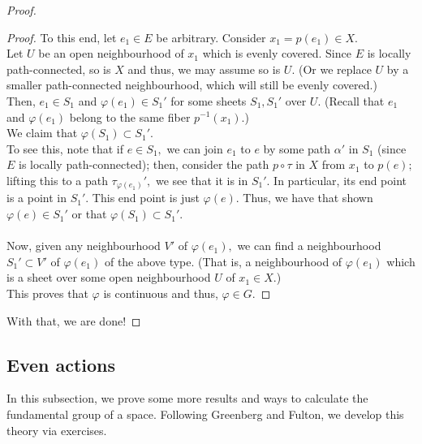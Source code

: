 \documentclass[12pt]{article}
\theoremstyle{definition}
\numberwithin{thm}{section}
\newenvironment{blockquote}
{\begin{mdframed}[skipabove=0pt, skipbelow=0pt, innertopmargin=4pt, innerbottommargin=4pt, bottomline=false,topline=false,rightline=false, linewidth=2pt]}
{\end{mdframed}}
\begin{document}
\begin{proof}
\begin{blockquote}
\begin{proof}
			To this end, let $e_1 \in E$ be arbitrary. Consider $x_1 = p(e_1) \in X.$\\
			Let $U$ be an open neighbourhood of $x_1$ which is evenly covered. Since $E$ is locally path-connected, so is $X$ and thus, we may assume so is $U.$ (Or we replace $U$ by a smaller path-connected neighbourhood, which will still be evenly covered.)\\
			Then, $e_1 \in S_1$ and $\varphi(e_1) \in S_1'$ for some sheets $S_1, S_1'$ over $U.$ (Recall that $e_1$ and $\varphi(e_1)$ belong to the same fiber $p^{-1}(x_1).$) \\
			We claim that $\varphi(S_1) \subset S_1'.$ \\
			To see this, note that if $e \in S_1,$ we can join $e_1$ to $e$ by some path $\alpha'$ in $S_1$ (since $E$ is locally path-connected); then, consider the path $p\circ \tau$ in $X$ from $x_1$ to $p(e);$ lifting this to a path $\tau_{\varphi(e_1)}',$ we see that it is in $S_1'.$ In particular, its end point is a point in $S_1'.$ This end point is just $\varphi(e).$ Thus, we have that shown $\varphi(e) \in S_1'$ or that $\varphi(S_1) \subset S_1'.$\\~\\
			Now, given any neighbourhood $V'$ of $\varphi(e_1),$ we can find a neighbourhood $S_1' \subset V'$ of $\varphi(e_1)$ of the above type. (That is, a neighbourhood of $\varphi(e_1)$ which is a sheet over some open neighbourhood $U$ of $x_1 \in X.$)\\
			This proves that $\varphi$ is continuous and thus, $\varphi \in G.$
		\end{proof}
	\end{blockquote}
	With that, we are done!
\end{proof}
\subsection{Even actions}
In this subsection, we prove some more results and ways to calculate the fundamental group of a space. Following Greenberg and Fulton, we develop this theory via exercises.
\end{document}
